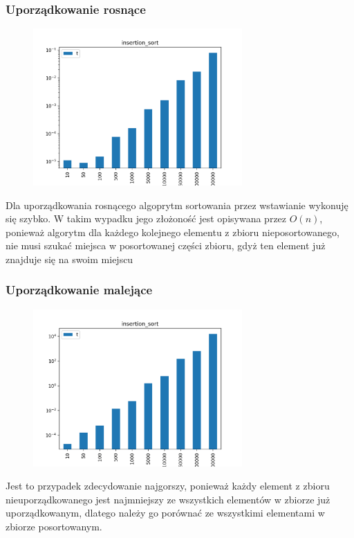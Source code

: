 \documentclass[]{article}
\begin{document}
		\subsubsection{Uporządkowanie rosnące}
			\begin{figure}[H]
				\centering
				\includegraphics[width=8cm]{insertion_sort_g.png}	
			\end{figure}
			Dla uporządkowania rosnącego algoprytm sortowania przez wstawianie wykonuję się szybko. W takim wypadku jego złożoność jest opisywana przez $ O(n) $, ponieważ algorytm dla każdego kolejnego elementu z zbioru nieposortowanego, nie musi szukać miejsca w posortowanej części zbioru, gdyż ten element już znajduje się na swoim miejscu
		\subsubsection{Uporządkowanie malejące}
			\begin{figure}[H]
				\centering
				\includegraphics[width=8cm]{insertion_sort_l.png}	
			\end{figure}
			Jest to przypadek zdecydowanie najgorszy, ponieważ każdy element z zbioru nieuporządkowanego jest najmniejszy ze wszystkich elementów w zbiorze już uporządkowanym, dlatego należy go porównać ze wszystkimi elementami w zbiorze posortowanym.
\end{document}
